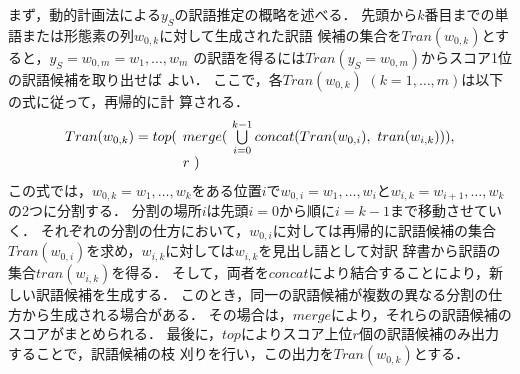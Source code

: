 \documentclass[japanese]{jnlp_1.3a}
\begin{document}
まず，動的計画法による$y_S$の訳語推定の概略を述べる．
先頭から$k$番目までの単語または形態素の列$w_{0,k}$に対して生成された訳語
候補の集合を$Tran(w_{0,k})$とすると，$y_S=w_{0,m}=w_{1}, \ldots, w_{m}$
の訳語を得るには$Tran(y_S=w_{0,m})$からスコア1位の訳語候補を取り出せば
よい．
ここで，各$Tran(w_{0,k})$ $(k=1,\ldots,m)$は以下の式に従って，再帰的に計
算される．
\begin{equation}
 \label{eq:Tran_calc}
  \begin{array}{ll}
   Tran(w_{0,k}) = top( \hspace{-0.2cm} & merge(\ \bigcup\limits_{i=0}^{k-1}
    concat(Tran(w_{0,i}),\ tran(w_{i,k}))), \\
   & r\ )
  \end{array}
\end{equation}
この式では，$w_{0,k}=w_{1}, \ldots, w_{k}$をある位置$i$で$w_{0,i}=w_{1},
\ldots, w_{i}$と$w_{i,k}=w_{i+1}, \ldots, w_{k}$の2つに分割する．
分割の場所$i$は先頭$i=0$から順に$i=k-1$まで移動させていく．
それぞれの分割の仕方において，$w_{0,i}$に対しては再帰的に訳語候補の集合
$Tran(w_{0,i})$を求め，$w_{i,k}$に対しては$w_{i,k}$を見出し語として対訳
辞書から訳語の集合$tran(w_{i,k})$を得る．
そして，両者を$concat$により結合することにより，新しい訳語候補を生成する．
このとき，同一の訳語候補が複数の異なる分割の仕方から生成される場合がある．
その場合は，$merge$により，それらの訳語候補のスコアがまとめられる．
最後に，$top$によりスコア上位$r$個の訳語候補のみ出力することで，訳語候補の枝
刈りを行い，この出力を$Tran(w_{0,k})$とする．
\end{document}
